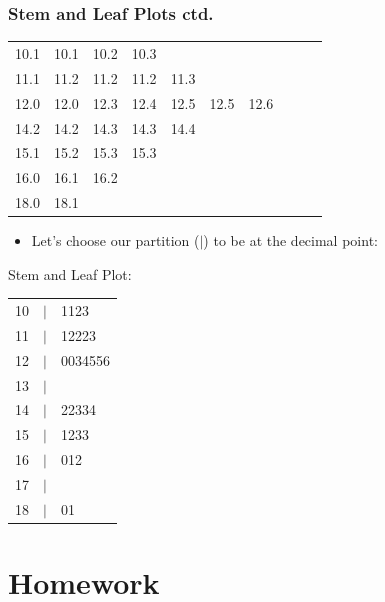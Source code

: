 \documentclass[xcolor=svgnames, compress]{beamer}
\begin{document}
\begin{frame}
\frametitle{Stem and Leaf Plots ctd.}


\footnotesize

\begin{center}
\begin{tabular}{c c c c c c c c c c}
10.1	&	10.1	&	10.2	&	10.3	\\ 
11.1	&	11.2	&	11.2	&	11.2	&	11.3	\\
12.0	&	12.0	&	12.3	&	12.4	&	12.5	&	12.5	&	12.6	\\
14.2	&	14.2	&	14.3	&	14.3	&	14.4	\\	
15.1	&	15.2	&	15.3	&	15.3	\\
16.0	&	16.1	&	16.2	\\
18.0	&	18.1	\\
\end{tabular}
\end{center}
\vspace{-0.250cm}
\begin{itemize}
\item	Let's choose our partition ($|$) to be at the decimal point:
\end{itemize}
\hspace{0.75cm} Stem and Leaf Plot:
\vspace{-0.30cm}
\begin{center}
\begin{tabular}{r c l}
10	&	$|$	&	1123		\\
11	&	$|$	&	12223	\\
12	&	$|$	&	0034556	\\
13	&	$|$	&			\\
14	&	$|$	&	22334	\\
15	&	$|$	&	1233		\\
16	&	$|$	&	012		\\
17	&	$|$	&			\\
18	&	$|$	&	01		\\
\end{tabular}
\end{center}

\end{frame}






\section{Homework}
\end{document}
